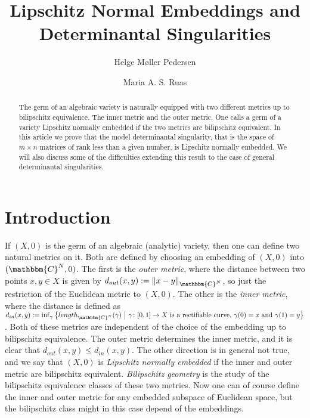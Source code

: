\documentclass[a4paper,oneside]{amsart}
\theoremstyle{definition}
\begin{document}


\title{Lipschitz Normal Embeddings and Determinantal Singularities}
\author{Helge M\o{}ller Pedersen}
\address{ICMC-USP}
\author{Maria A. S. Ruas}
\address{ICMC-USP}
\begin{abstract} 
The germ of an algebraic variety is naturally equipped with two
different metrics up to bilipschitz equivalence. The inner metric and
the outer metric. One calls a germ of a variety Lipschitz normally
embedded if the two metrics are bilipschitz equivalent. In this
article we prove that the model determinantal singularity, that is the
space of $m\times n$ matrices of rank less than a given number, is
Lipschitz normally embedded. We will also discuss some of the
difficulties extending this result to the case of general
determinantal singularities. 
\end{abstract}
\maketitle

\section{Introduction}

If $(X,0)$ is the germ of an algebraic (analytic) variety, then one
can define two natural metrics on it. Both are defined by choosing an
embedding of $(X,0)$ into $({\mathbbm{C}}^N,0)$. The first is the \emph{outer
  metric}, where the distance between two points $x,y\in X$ is given by
$d_{out}(x,y) := {\lVert {x-y} \rVert}_{{\mathbbm{C}}^N}$, so just the restriction of the
Euclidean metric to $(X,0)$. The other is the \emph{inner metric},
where the distance is defined as $d_{in}(x,y) := \inf_{\gamma}
\big{\{} length_{{\mathbbm{C}}^N}(\gamma)\ \big{\vert}\ { {\gamma} \colon {[0,1]} \to {X}} \text{
  is a rectifiable curve, } \gamma(0) = x \text{ and }
\gamma(1) = y \big{\}}$. Both of these metrics are independent of the
choice of the embedding up to bilipschitz equivalence. The outer metric
determines the inner metric, and it is clear that $d_{out}(x,y) \leq
d_{in} (x,y)$. The other direction is in general not true, and we say
that $(X,0)$ is \emph{Lipschitz normally embedded} if the inner and
outer metric are bilipschitz equivalent. \emph{Bilipschitz geometry}
is the study of the bilipschitz equivalence classes of these two
metrics. Now one can of course define
the inner and outer metric for any embedded subspace of Euclidean space, but the
bilipschitz class might in this case depend of the embeddings.
\end{document}
